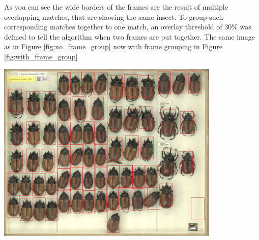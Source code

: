 As you can see the wide borders of the frames are the result of multiple overlapping matches, that are showing the same insect.
To group such corresponding matches together to one match, an overlay threshold of 30\% was defined to tell the algorithm when two frames are put together.
The same image as in Figure \ref{fig:no_frame_group} now with frame grouping in Figure \ref{fig:with_frame_group}
\begin{center}
	\includegraphics[width=0.8\textwidth]{images/with_frame_group.jpg}
	\label{fig:with_frame_group}
\end{center}

